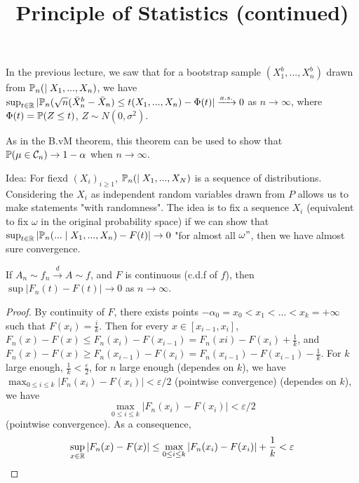 \documentclass[a4paper]{article}
\begin{document}
\title{Principle of Statistics (continued) }

\maketitle

\newpage

\tableofcontents

\newpage

In the previous lecture, we saw that for a bootstrap sample $(X_1^b,...,X_n^b)$ drawn from $\P_n( \mid X_1,...,X_n)$, we have $\sup_{t \in \R} | \P_n(\sqrt{n} (\bar{X}_n^b - \bar{X}_n) \leq t(X_1,...,X_n) - \Phi(t) | \xrightarrow{a.s.} 0$ as $n \to \infty$, where $\Phi(t) = \P(Z \leq t)$, $Z \sim N(0,\sigma^2)$.

\begin{rem}
As in the B.vM theorem, this theorem can be used to show that $\P(\mu \in \mathcal{C}_n) \to 1-\alpha$ when $n \to \infty$.
\end{rem}

Idea: For fiexd $(X_i)_{i \geq 1}$, $\P_n(\mid X_1,...,X_N)$ is a sequence of distributions. Considering the $X_i$ as independent random variables drawn from $P$ allows us to make statements "with randomness". The idea is to fix a sequence $X_i$ (equivalent to fix $\omega$ in the original probability space) if we can show that $\sup_{t \in \R} |\P_n(...\mid X_1,...,X_n) - F(t)| \to 0$ "for almost all $\omega"$, then we have almost sure convergence.

\begin{lemma}
If $A_n \sim f_n \xrightarrow{d} A \sim f$, and $F$ is continuous (c.d.f of $f$), then $\sup|F_n(t) - F(t)| \to 0$ as $n \to \infty$.
\begin{proof}
By continuity of $F$, there exists points $-\alpha_0 = x_0 < x_1 < ... < x_k = +\infty$ such that $F(x_i) = \frac{i}{k}$. Then for every $x \in [x_{i-1},x_i]$, $F_n(x) - F(x) \leq F_n(x_i) - F(x_{i-1}) = F_n(xi)-F(x_i) + \frac{1}{k}$, and $F_n(x) - F(x) \geq F_n(x_{i-1}) - F(x_i) = F_n(x_{i-1}) - F(x_{i-1}) - \frac{1}{k}$. For $k$ large enough, $\frac{1}{k} < \frac{\varepsilon}{2}$, for $n$ large enough (dependes on $k$), we have $\max_{0 \leq i \leq k} |F_n(x_i) - F(x_i)| < \varepsilon/2$ (pointwise convergence) (dependes on $k$), we have $$\max_{0 \leq i \leq k} |F_n(x_i) - F(x_i)| < \varepsilon/2$$ (pointwise convergence). As a consequence, $$\sup_{x \in \R} |F_n(x) - F(x)| \leq \max_{0 \leq i \leq k} |F_n(x_i) - F(x_i)| + \frac{1}{k}<\varepsilon$$
\end{proof}
\end{lemma}
\end{document}
